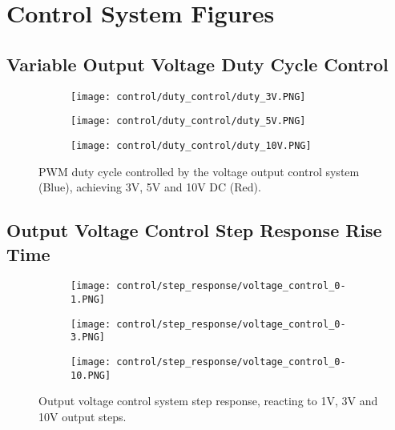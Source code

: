 \chapter{Control System Figures}\label{A:control}
\vspace{-20pt}

\section{Variable Output Voltage Duty Cycle Control} \label{A:control_duty}

\begin{figure}[H]
    
    \centering
    \begin{subfigure}{0.5\textwidth}
        \texttt{[image: control/duty\_control/duty\_3V.PNG]}
    \end{subfigure}
    \begin{subfigure}{0.5\textwidth}
        \texttt{[image: control/duty\_control/duty\_5V.PNG]}
    \end{subfigure}
    \begin{subfigure}{0.5\textwidth}
        \texttt{[image: control/duty\_control/duty\_10V.PNG]}
    \end{subfigure}
    \caption{PWM duty cycle controlled by the voltage output control system (Blue), achieving 3V, 5V and 10V DC (Red).}
\end{figure}

\section{Output Voltage Control Step Response Rise Time} \label{A:control_step_rise}
\begin{figure}[H]
    \centering
    \begin{subfigure}{0.62\textwidth}
        \texttt{[image: control/step\_response/voltage\_control\_0-1.PNG]}
    \end{subfigure}
    \begin{subfigure}{0.62\textwidth}
        \texttt{[image: control/step\_response/voltage\_control\_0-3.PNG]}
    \end{subfigure}
    \begin{subfigure}{0.62\textwidth}
        \texttt{[image: control/step\_response/voltage\_control\_0-10.PNG]}
    \end{subfigure}
    \caption{Output voltage control system step response, reacting to 1V, 3V and 10V output steps.}
\end{figure}

